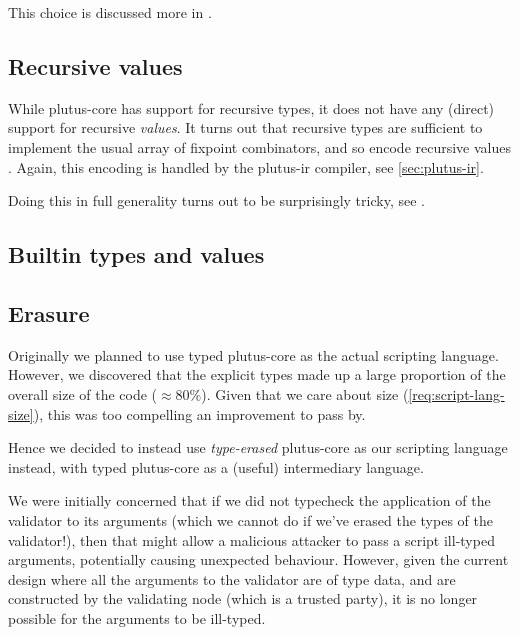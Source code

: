 This choice is discussed more in \textcite{plutus-core-spec, peytonjones2019unraveling}.

\subsection{Recursive values}

While \gls{plutus-core} has support for recursive types, it does not have any (direct) support for recursive \emph{values}.
It turns out that recursive types are sufficient to implement the usual array of fixpoint combinators, and so encode recursive values \autocite{harper2012practical}.
Again, this encoding is handled by the \gls{plutus-ir} compiler, see \cref{sec:plutus-ir}.

Doing this in full generality turns out to be surprisingly tricky, see \textcite{peytonjones2019unraveling}.

\subsection{Builtin types and values}


\subsection{Erasure}
\label{sec:erasure}

Originally we planned to use typed \gls{plutus-core} as the actual scripting language.
However, we discovered that the explicit types made up a large proportion of the overall size of the code ($\approx 80\%$).
Given that we care about size (\cref{req:script-lang-size}), this was too compelling an improvement to pass by.

Hence we decided to instead use \emph{type-erased} \gls{plutus-core} as our scripting language instead, with typed \gls{plutus-core} as a (useful) intermediary language.

We were initially concerned that if we did not typecheck the application of the \gls{validator} to its arguments (which we cannot do if we've erased the types of the \gls{validator}!), then that might allow a malicious attacker to pass a script ill-typed arguments, potentially causing unexpected behaviour.
However, given the current design where all the arguments to the \gls{validator} are of type \gls{data}, and are constructed by the validating node (which is a trusted party), it is no longer possible for the arguments to be ill-typed.

